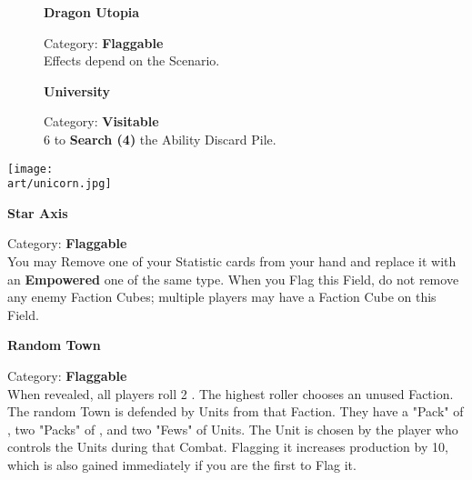 \begin{figure}[H]
  \begin{minipage}[t]{0.47\textwidth}
    \vspace{0pt}
    \centering
    \textbf{Dragon Utopia}\par
    \caption{\small Category: \textbf{Flaggable}\\Effects depend on the Scenario.}
  \end{minipage}\hfill
  \begin{minipage}[t]{0.47\textwidth}
    \vspace{0pt}
    \centering
    \textbf{University}\par
    \caption{\small Category: \textbf{Visitable}\\
       6  to \textbf{Search (4)} the Ability Discard Pile.}
  \end{minipage}
\end{figure}

\begin{multicols*}{2}

{\centering\phantom{Star Axis}\par}
\texttt{[image: \\art/unicorn.jpg]}

\columnbreak

{\centering\textbf{Star Axis}\par}
{\small Category: \textbf{Flaggable}\\
  You may Remove one of your Statistic cards from your hand and replace it with an \textbf{Empowered} one of the same type.
  When you Flag this Field, do not remove any enemy Faction Cubes; multiple players may have a Faction Cube on this Field.
}

\bigskip

{\centering\textbf{\hypertarget{Random Town}{Random Town}}\par}
{\small Category: \textbf{Flaggable}\\
  When revealed, all players roll 2 .
  The highest roller chooses an unused Faction.
  The random Town is defended by Units from that Faction.
  They have a "Pack" of , two "Packs" of , and two "Fews" of  Units.
  The  Unit is chosen by the player who controls the Units during that Combat.
  Flagging it increases  production by 10, which is also gained immediately if you are the first to Flag it.
}

\end{multicols*}
